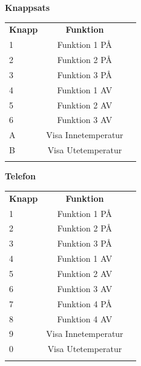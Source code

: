 \documentclass[a4paper,11pt]{article}
\begin{document}
	{\bf Knappsats}\\
	\begin{tabular}{l c r}
		\\{\bf Knapp} & {\bf Funktion}\\
		1 & Funktion 1 PÅ\\		
		2 & Funktion 2 PÅ\\		
		3 & Funktion 3 PÅ\\
		4 & Funktion 1 AV\\	
		5 & Funktion 2 AV\\
		6 & Funktion 3 AV\\		
		A & Visa Innetemperatur\\
		B & Visa Utetemperatur \\\\
	\end{tabular}

	{\bf Telefon}\\
	\begin{tabular}{l c r}
		\\{\bf Knapp} & {\bf Funktion}\\
		1 & Funktion 1 PÅ\\		
		2 & Funktion 2 PÅ\\		
		3 & Funktion 3 PÅ\\
		4 & Funktion 1 AV\\	
		5 & Funktion 2 AV\\
		6 & Funktion 3 AV\\
		7 & Funktion 4 PÅ\\
		8 & Funktion 4 AV\\		
		9 & Visa Innetemperatur\\
		0 & Visa Utetemperatur \\\\
	\end{tabular}
\end{document}
